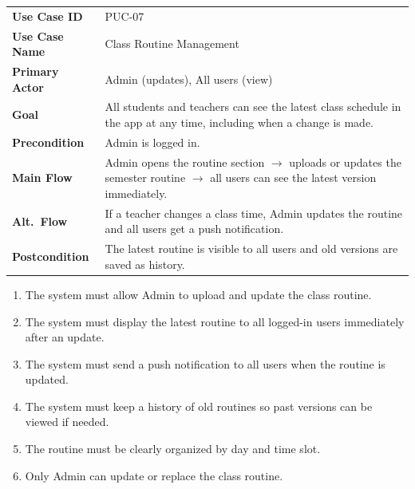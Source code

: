 \documentclass[12pt,a4paper]{article}
\begin{document}
\begin{tcolorbox}[pucbox, title={Product Use Case --- PUC-07}]
\begin{tabularx}{\linewidth}{p{3.5cm} X}
\textbf{Use Case ID}    & PUC-07 \\
\textbf{Use Case Name}  & Class Routine Management \\
\textbf{Primary Actor}  & Admin (updates), All users (view) \\
\textbf{Goal}           & All students and teachers can see the latest class schedule in the app at any time, including when a change is made. \\
\textbf{Precondition}   & Admin is logged in. \\
\textbf{Main Flow}      & Admin opens the routine section $\rightarrow$ uploads or updates the semester routine $\rightarrow$ all users can see the latest version immediately. \\
\textbf{Alt.\ Flow}     & If a teacher changes a class time, Admin updates the routine and all users get a push notification. \\
\textbf{Postcondition}  & The latest routine is visible to all users and old versions are saved as history. \\
\end{tabularx}
\end{tcolorbox}

\begin{tcolorbox}[frbox, title={Functional Requirements --- PUC-07}]
\begin{enumerate}[leftmargin=*, label=\textbf{FR-07.\arabic*}, itemsep=5pt]
  \item The system must allow Admin to upload and update the class routine.
  \item The system must display the latest routine to all logged-in users immediately after an update.
  \item The system must send a push notification to all users when the routine is updated.
  \item The system must keep a history of old routines so past versions can be viewed if needed.
  \item The routine must be clearly organized by day and time slot.
  \item Only Admin can update or replace the class routine.
\end{enumerate}
\end{tcolorbox}
\end{document}

